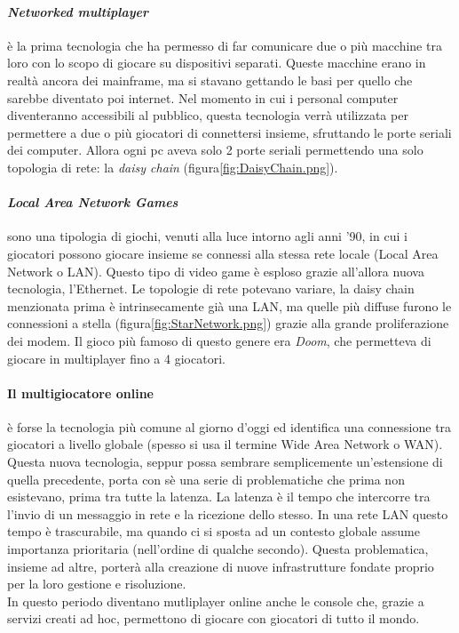         \paragraph{\textit{Networked multiplayer}} è la prima tecnologia che ha permesso di far comunicare due o più macchine tra loro con lo scopo di giocare su dispositivi separati. 
            Queste macchine erano in realtà ancora dei mainframe, ma si stavano gettando le basi per quello che sarebbe diventato poi internet. Nel momento in cui i personal computer
            diventeranno accessibili al pubblico, questa tecnologia verrà utilizzata per permettere a due o più giocatori di connettersi insieme, sfruttando le porte seriali dei computer. 
            Allora ogni pc aveva solo 2 porte seriali permettendo una solo topologia di rete: la \textit{daisy chain} (figura\ref{fig:DaisyChain.png}).
 
        \paragraph{\textit{Local Area Network Games}} sono una tipologia di giochi, venuti alla luce intorno agli anni '90, in cui i giocatori possono giocare insieme se connessi alla stessa
            rete locale (Local Area Network o LAN). Questo tipo di video game è esploso grazie all'allora nuova tecnologia, l'Ethernet. Le topologie di rete potevano variare,
            la daisy chain menzionata prima è intrinsecamente già una LAN, ma quelle più diffuse furono le connessioni a stella (figura\ref{fig:StarNetwork.png}) grazie alla grande 
            proliferazione dei modem. Il gioco più famoso di questo genere era \textit{Doom}, che permetteva di giocare in multiplayer fino a 4 giocatori.

        \paragraph{Il multigiocatore online} è forse la tecnologia più comune al giorno d'oggi ed identifica una connessione tra giocatori a livello globale (spesso si usa il termine
            Wide Area Network o WAN). Questa nuova tecnologia, seppur possa sembrare semplicemente un'estensione di quella precedente, porta con sè una serie di problematiche
            che prima non esistevano, prima tra tutte la latenza. La latenza è il tempo che intercorre tra l'invio di un messaggio in rete e la ricezione dello stesso. In una rete
            LAN questo tempo è trascurabile, ma quando ci si sposta ad un contesto globale assume importanza prioritaria (nell'ordine di qualche secondo). Questa problematica, insieme
            ad altre, porterà alla creazione di nuove infrastrutture fondate proprio per la loro gestione e risoluzione.\\
            In questo periodo diventano mutliplayer online anche le console che, grazie a servizi creati ad hoc, permettono di giocare con giocatori di tutto il mondo. 
        
